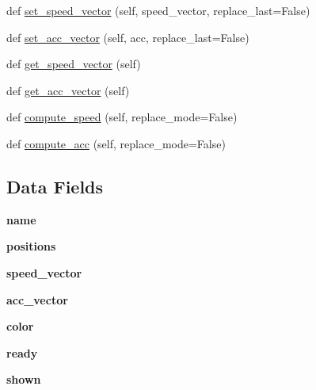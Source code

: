 \begin{DoxyCompactItemize}
\item 
def \mbox{\hyperlink{classmovingentity_1_1_moving_entity_a86f9b2b879ff5e2db1010bdf4d5a03a1}{set\+\_\+speed\+\_\+vector}} (self, speed\+\_\+vector, replace\+\_\+last=False)
\item 
def \mbox{\hyperlink{classmovingentity_1_1_moving_entity_a42416d83ae7a1df561c13585f1389a6e}{set\+\_\+acc\+\_\+vector}} (self, acc, replace\+\_\+last=False)
\item 
def \mbox{\hyperlink{classmovingentity_1_1_moving_entity_a6e456d51469dc3f6d79559a1c0a552b5}{get\+\_\+speed\+\_\+vector}} (self)
\item 
def \mbox{\hyperlink{classmovingentity_1_1_moving_entity_ac53c8044d0401c60c3a6070cf22caee8}{get\+\_\+acc\+\_\+vector}} (self)
\item 
def \mbox{\hyperlink{classmovingentity_1_1_moving_entity_a547093d75e0e1ade6c2df927e0907bd6}{compute\+\_\+speed}} (self, replace\+\_\+mode=False)
\item 
def \mbox{\hyperlink{classmovingentity_1_1_moving_entity_a799b068567d0358b6bc0f6ec2cbdeb02}{compute\+\_\+acc}} (self, replace\+\_\+mode=False)
\end{DoxyCompactItemize}
\subsection*{Data Fields}
\begin{DoxyCompactItemize}
\item 
\mbox{\label{classmovingentity_1_1_moving_entity_ab74e6bf80237ddc4109968cedc58c151}} 
{\bfseries name}
\item 
\mbox{\label{classmovingentity_1_1_moving_entity_ac17d0e3d420545b0cbe7c718cf026ddc}} 
{\bfseries positions}
\item 
\mbox{\label{classmovingentity_1_1_moving_entity_a69dc6ef2269f17b85dfb95fffad29d9f}} 
{\bfseries speed\+\_\+vector}
\item 
\mbox{\label{classmovingentity_1_1_moving_entity_a0b7c4c1c91c90593e9c359a6cbed6274}} 
{\bfseries acc\+\_\+vector}
\item 
\mbox{\label{classmovingentity_1_1_moving_entity_a37dbdc30935031c05304482e1be89d8f}} 
{\bfseries color}
\item 
\mbox{\label{classmovingentity_1_1_moving_entity_ab0db378e6ced1decdb42263d4cb2789a}} 
{\bfseries ready}
\item 
\mbox{\label{classmovingentity_1_1_moving_entity_ac6c1eeb684483c821de0ec90f6c47cb9}} 
{\bfseries shown}
\end{DoxyCompactItemize}



